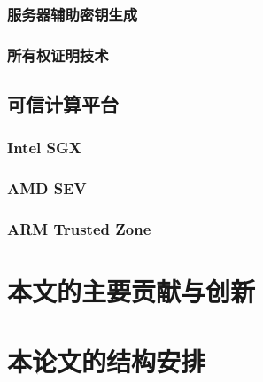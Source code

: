 \subsubsection{服务器辅助密钥生成}
\subsubsection{所有权证明技术}
\subsection{可信计算平台}
\subsubsection{Intel SGX}
\subsubsection{AMD SEV}
\subsubsection{ARM Trusted Zone}


\section{本文的主要贡献与创新}

\section{本论文的结构安排}